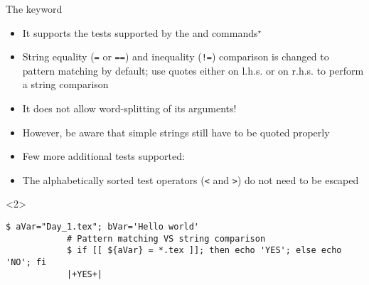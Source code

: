 \begin{frame}[fragile]{The \bash{[[} keyword}
    \vspace{-3mm}
    \begin{itemize}[<only@1>]
        \item It supports the tests supported by the  and \bash{[} commands$^{\star}$
        \item String equality (\texttt{=} or \texttt{==}) and inequality (\texttt{!=}) comparison is changed to \alert{pattern matching} by default; use quotes either on l.h.s. or on r.h.s. to perform a string comparison
        \item \alert{It does not allow word-splitting} of its arguments!
        \item However, be aware that simple strings still have to be quoted properly
        \item Few more additional tests supported:
        \item The alphabetically sorted test operators (\texttt{<} and \texttt{>}) do not need to be escaped
    \end{itemize}
    \begin{onlyenv}<2>
        \begin{lstlisting}[style=MyBash, style=oddnumbers, style=smaller, xleftmargin=1mm, xrightmargin=1mm]
            $ aVar="Day_1.tex"; bVar='Hello world'
            # Pattern matching VS string comparison
            $ if [[ ${aVar} = *.tex ]]; then echo 'YES'; else echo 'NO'; fi
            |+YES+|

\end{lstlisting}
\end{onlyenv}
\end{frame}
